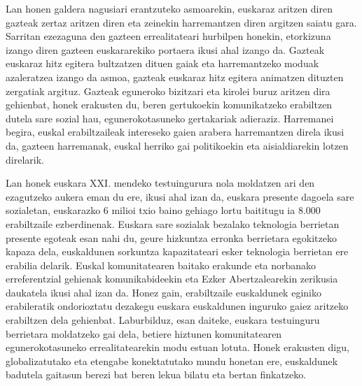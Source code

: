 \documentclass[information,article,submit,moreauthors,pdftex,10pt,a4paper]{Definitions/mdpi}
\begin{document}
Lan honen galdera nagusiari erantzuteko asmoarekin, euskaraz aritzen diren gazteak zertaz aritzen diren eta zeinekin harremantzen diren argitzen saiatu gara. Sarritan ezezaguna den gazteen errealitateari hurbilpen honekin, etorkizuna izango diren gazteen euskararekiko portaera ikusi ahal izango da. Gazteak euskaraz hitz egitera bultzatzen dituen gaiak eta harremantzeko moduak azaleratzea izango da asmoa, gazteak euskaraz hitz egitera animatzen dituzten zergatiak argituz. Gazteak eguneroko bizitzari eta kirolei buruz aritzen dira gehienbat, honek erakusten du, beren gertukoekin komunikatzeko erabiltzen dutela sare sozial hau, egunerokotasuneko gertakariak adieraziz. Harremanei begira, euskal erabiltzaileak intereseko gaien arabera harremantzen direla ikusi da, gazteen harremanak, euskal herriko gai politikoekin eta aisialdiarekin lotzen direlarik.

Lan honek euskara XXI. mendeko testuingurura nola moldatzen ari den ezagutzeko aukera eman du ere, ikusi ahal izan da, euskara presente dagoela sare sozialetan, euskarazko 6 milioi txio baino gehiago lortu baititugu ia 8.000 erabiltzaile ezberdinenak. Euskara sare sozialak bezalako teknologia berrietan presente egoteak esan nahi du, geure hizkuntza erronka berrietara egokitzeko kapaza dela, euskaldunen sorkuntza kapazitateari esker teknologia berrietan ere erabilia delarik. Euskal komunitatearen baitako erakunde eta norbanako erreferentzial gehienak komunikabideekin eta Ezker Abertzalearekin zerikusia daukatela ikusi ahal izan da. Honez gain, erabiltzaile euskaldunek eginiko erabileratik ondorioztatu dezakegu euskara euskaldunen inguruko gaiez aritzeko erabiltzen dela gehienbat. Laburbilduz, esan daiteke, euskara testuinguru berrietara moldatzeko gai dela, betiere hiztunen komunitatearen egunerokotasuneko errealitatearekin modu estuan lotuta. Honek erakusten digu, globalizatutako eta etengabe konektatutako mundu honetan ere, euskaldunek badutela gaitasun berezi bat beren lekua bilatu eta bertan finkatzeko.


\vspace{6pt}


\end{document}
